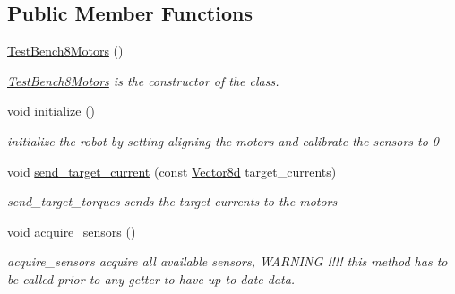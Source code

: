 \subsection*{Public Member Functions}
\begin{DoxyCompactItemize}
\item 
\mbox{\label{classblmc__robots_1_1TestBench8Motors_a99006d989ac690956a2e1ab9b710de0f}} 
\hyperlink{classblmc__robots_1_1TestBench8Motors_a99006d989ac690956a2e1ab9b710de0f}{Test\+Bench8\+Motors} ()
\begin{DoxyCompactList}\small\item\em \hyperlink{classblmc__robots_1_1TestBench8Motors}{Test\+Bench8\+Motors} is the constructor of the class. \end{DoxyCompactList}\item 
\mbox{\label{classblmc__robots_1_1TestBench8Motors_aa8981496d1193752de3017a3eebb87dc}} 
void \hyperlink{classblmc__robots_1_1TestBench8Motors_aa8981496d1193752de3017a3eebb87dc}{initialize} ()
\begin{DoxyCompactList}\small\item\em initialize the robot by setting aligning the motors and calibrate the sensors to 0 \end{DoxyCompactList}\item 
\mbox{\label{classblmc__robots_1_1TestBench8Motors_a5194da9e85b4391e9ff6c5bf5a07faf2}} 
void \hyperlink{classblmc__robots_1_1TestBench8Motors_a5194da9e85b4391e9ff6c5bf5a07faf2}{send\+\_\+target\+\_\+current} (const \hyperlink{common__header_8hpp_a98975ffbe0bca1296078e0350dfedd60}{Vector8d} target\+\_\+currents)
\begin{DoxyCompactList}\small\item\em send\+\_\+target\+\_\+torques sends the target currents to the motors \end{DoxyCompactList}\item 
\mbox{\label{classblmc__robots_1_1TestBench8Motors_a2792f7d4866c396ddfb88730a1644988}} 
void \hyperlink{classblmc__robots_1_1TestBench8Motors_a2792f7d4866c396ddfb88730a1644988}{acquire\+\_\+sensors} ()
\begin{DoxyCompactList}\small\item\em acquire\+\_\+sensors acquire all available sensors, W\+A\+R\+N\+I\+NG !!!! this method has to be called prior to any getter to have up to date data. \end{DoxyCompactList}\item 

\end{DoxyCompactItemize}
